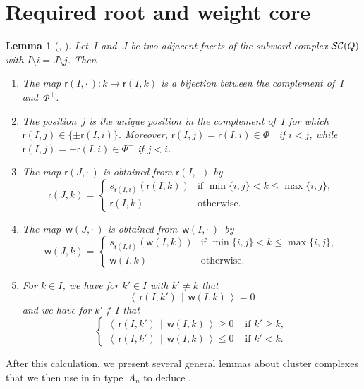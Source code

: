 \documentclass[10pt]{amsart}
\newtheorem{lemm}[theo]{Lemma}\newtheorem{prop}[theo]{Proposition}\newtheorem{coro}[theo]{Corollary}\newtheorem{conj}[theo]{Conjecture}
\theoremstyle{definition}\newtheorem{rema}[theo]{Remark}\newtheorem{exem}[theo]{Example}
\newcommand{\subwordComplex}{\mathcal{SC}}
\newcommand{\sq}[1]{{\rm #1}}
\newcommand{\Q}{\sq{Q}}
\newcommand{\sfr}{\mathsf{r}}
\newcommand{\sfw}{\mathsf{w}}
\newcommand{\Root}[2]{{\sfr}(#1,#2)}
\newcommand{\Weight}[2]{{\sfw}(#1,#2)}
\newcommand{\dotprod}[2]{\left\langle \, #1 \,\middle|\, #2 \, \right\rangle}
\begin{document}
\section{Required root and weight core}
\begin{lemm}[{\cite[Lemma~3.3 \& Lemma~3.6]{CLS2014}, \cite[Lemma~3.3, Lemma~4.4 \& Proposition~6.6]{PS2015}}]\label{lem:lemma33}
Let~$I$ and~$J$ be two adjacent facets of the subword complex $\subwordComplex(\Q)$ with $I\setminus i = J \setminus j$. Then
\begin{enumerate}
\item\label{it:bijectionpositiveroots}
The map $\Root{I}{\cdot\,}: k \mapsto \Root{I}{k}$ is a bijection between the complement of~$I$ and~$\Phi^+$.
\item\label{it:rootflip}
The position~$j$ is the unique position in the complement of~$I$ for which $\Root{I}{j}\in \{\pm \Root{I}{i}\}$. Moreover, $\Root{I}{j}=\Root{I}{i}\in \Phi^+$ if $i<j$, while $\Root{I}{j}=-\Root{I}{i}\in \Phi^-$ if $j<i$.
\item\label{it:rootupdate}
The map $\Root{J}{\cdot\,}$ is obtained from $\Root{I}{\cdot\,}$ by
\[
\Root{J}{k}=\left\{
\begin{array}{cc}s_{\Root{I}{i}}(\Root{I}{k}) & \mbox{if } \min\{i,j\}<k\leq \max\{i,j\}, \\\Root{I}{k} & \mbox{otherwise}.
\end{array}\right.
\]
\item\label{it:weightupdate}
The map~$\Weight{J}{\cdot\,}$ is obtained from~$\Weight{I}{\cdot\,}$~by
\[
\Weight{J}{k} =
\begin{cases} s_{\Root{I}{i}}(\Weight{I}{k}) & \text{if } \min\{i,j\} < k \le \max\{i,j\}, \\ \Weight{I}{k} & \text{otherwise}.
\end{cases}
\]
\item\label{it:weightroot}
For $k \in I$, we have for $k' \in I$ with $k' \neq k$ that
\[
\dotprod{\Root{I}{k'}}{\Weight{I}{k}} = 0
\]
and we have for $k' \notin I$ that
\[
\begin{cases}
\dotprod{\Root{I}{k'}}{\Weight{I}{k}} \geq 0 & \text{ if }k' \ge k, \\
\dotprod{\Root{I}{k'}}{\Weight{I}{k}} \leq 0 & \text{ if }k' < k.
\end{cases}
\]
\end{enumerate}
\end{lemm}
After this calculation, we present several general lemmas about cluster complexes that we then use in  in type~$A_n$ to deduce .
\end{document}
